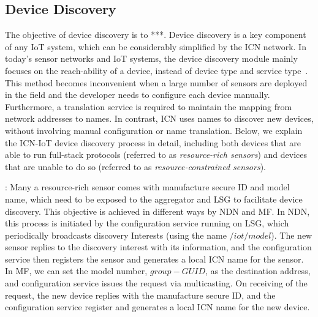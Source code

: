 \subsection{Device Discovery}
The objective of device discovery is to ***.
Device discovery is a key component of any IoT system, which can be considerably simplified by the ICN network. In today's sensor networks and IoT systems, the device discovery module mainly focuses on the reach-ability of a device, instead of device type and service type~\cite{***}. This method becomes inconvenient when a large number of sensors are deployed in the field and the developer needs to configure each device manually. Furthermore, a translation service is required to maintain the mapping from network addresses to names. In contrast, ICN uses names to discover new devices, without involving manual configuration or name translation. Below, we explain the ICN-IoT device discovery process in detail, including both devices that are able to run  full-stack protocols (referred to as \emph{resource-rich sensors}) and devices that are unable to do so (referred to as \emph{resource-constrained sensors}).

\vspace{1mm}: Many a resource-rich sensor comes with manufacture secure ID and model name, which need to be exposed to the aggregator and LSG to facilitate device discovery. This objective is achieved in different ways by NDN and MF.  In NDN, this process is initiated by the configuration service running on LSG, which periodically broadcasts discovery Interests (using the name $/iot/model$). The new sensor replies to the discovery interest with its information, and the configuration service then registers the sensor and generates a local ICN name for the sensor. In MF, we can set the model number, $group-GUID$, as the destination address, and configuration service issues the request via multicasting. On receiving of the request, the new device replies with the manufacture secure ID, and the configuration service register and generates a local ICN name for the new device.


